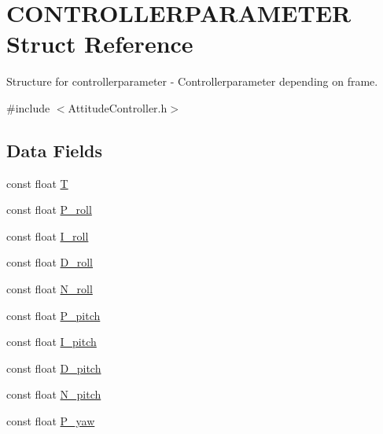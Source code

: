 \hypertarget{struct_c_o_n_t_r_o_l_l_e_r_p_a_r_a_m_e_t_e_r}{}\section{C\+O\+N\+T\+R\+O\+L\+L\+E\+R\+P\+A\+R\+A\+M\+E\+T\+ER Struct Reference}
\label{struct_c_o_n_t_r_o_l_l_e_r_p_a_r_a_m_e_t_e_r}


Structure for controllerparameter -\/ Controllerparameter depending on frame.  




{\ttfamily \#include $<$Attitude\+Controller.\+h$>$}

\subsection*{Data Fields}
\begin{DoxyCompactItemize}
\item 
const float \hyperlink{struct_c_o_n_t_r_o_l_l_e_r_p_a_r_a_m_e_t_e_r_aff46f1549c4457b9b1dbdc777c0949e5}{T}
\item 
const float \hyperlink{struct_c_o_n_t_r_o_l_l_e_r_p_a_r_a_m_e_t_e_r_a146c938d6d8675608d33ce61d2304000}{P\+\_\+roll}
\item 
const float \hyperlink{struct_c_o_n_t_r_o_l_l_e_r_p_a_r_a_m_e_t_e_r_ac53757421660e3d857daebf02210c1a9}{I\+\_\+roll}
\item 
const float \hyperlink{struct_c_o_n_t_r_o_l_l_e_r_p_a_r_a_m_e_t_e_r_a71e576fe2c6d8155d633c2cb7ac4132d}{D\+\_\+roll}
\item 
const float \hyperlink{struct_c_o_n_t_r_o_l_l_e_r_p_a_r_a_m_e_t_e_r_a28f4948f7628a237a01e364a0301b0d4}{N\+\_\+roll}
\item 
const float \hyperlink{struct_c_o_n_t_r_o_l_l_e_r_p_a_r_a_m_e_t_e_r_a4ca5f44cd54b396792e64958e549c38d}{P\+\_\+pitch}
\item 
const float \hyperlink{struct_c_o_n_t_r_o_l_l_e_r_p_a_r_a_m_e_t_e_r_a62512d094b303862568f84d43652bf86}{I\+\_\+pitch}
\item 
const float \hyperlink{struct_c_o_n_t_r_o_l_l_e_r_p_a_r_a_m_e_t_e_r_a499708892320f30d636311d9ba74e09c}{D\+\_\+pitch}
\item 
const float \hyperlink{struct_c_o_n_t_r_o_l_l_e_r_p_a_r_a_m_e_t_e_r_ac871c09dead58edfe235c47fb675c310}{N\+\_\+pitch}
\item 
const float \hyperlink{struct_c_o_n_t_r_o_l_l_e_r_p_a_r_a_m_e_t_e_r_a1d339345180b617cd8ab579c614c8896}{P\+\_\+yaw}
\end{DoxyCompactItemize}


